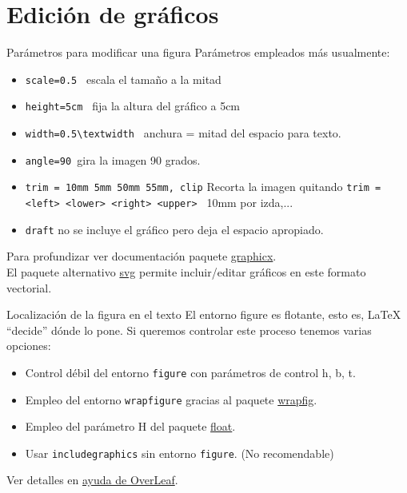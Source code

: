 \documentclass[10pt]{beamer}
\begin{document}
\section{Edición de gráficos}

\begin{frame}[fragile]{Parámetros para modificar una figura}
Parámetros empleados más usualmente:
\begin{itemize}
    \item \verb|scale=0.5 | \hfill escala el tamaño a la mitad
    \item \verb|height=5cm | \hfill fija la altura del gráfico a 5cm
    \item \verb|width=0.5\textwidth | \hfill anchura = mitad del espacio para texto.
    \item \verb|angle=90 |\hfill  gira la imagen 90 grados.
    \item \verb|trim = 10mm 5mm 50mm 55mm, clip| \hfill Recorta la imagen quitando
\verb|trim = <left> <lower> <right> <upper> | \hfill 10mm por izda,...
    \item \verb|draft| \hfill no se incluye el gráfico pero deja el espacio apropiado.
\end{itemize}
\vspace{1cm}
Para profundizar ver documentaci\'on paquete \href{https://ctan.org/pkg/graphicx}{\color{blue} graphicx}. \\
{\scriptsize El paquete  alternativo \href{https://ctan.org/pkg/svg}{\color{blue} svg} permite incluir/editar gráficos en este formato vectorial.}
\end{frame}
\begin{frame}[fragile]{Localización de la figura en el texto}
El entorno figure es flotante, esto es, \LaTeX{} ``decide''
dónde lo pone. Si queremos controlar este proceso tenemos varias 
opciones:
\begin{itemize}
    \item Control débil del entorno \verb|figure| con parámetros 
    de control h, b, t. 
    \item Empleo del entorno \verb|wrapfigure| gracias al paquete \href{https://www.ctan.org/pkg/wrapfig}{\color{blue} wrapfig}.
    \item Empleo del parámetro H del paquete \href{https://www.ctan.org/pkg/float}{\color{blue} float}.
    \item Usar \verb|includegraphics| sin entorno \verb|figure|. \hfill (No recomendable)
\end{itemize}
\vspace{1cm}
Ver detalles en \href{https://www.overleaf.com/learn/latex/Positioning_images_and_tables}{\color{blue}ayuda de OverLeaf}.
\end{frame}
\end{document}
